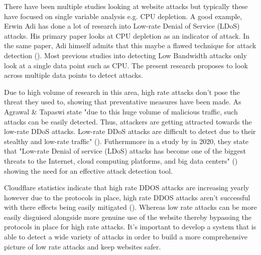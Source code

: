 
There have been multiple studies looking at website attacks but typically these have focused on single variable analysis e.g. CPU depletion. A good example, Erwin Adi has done a lot of research into Low-rate Denial of Service (LDoS) attacks. His primary paper looks at CPU depletion as an indicator of attack. In the same paper, Adi himself admits that this maybe a flawed technique for attack detection (\cite{Adi2016}). Most previous studies into detecting Low Bandwidth attacks only look at a single data point such as CPU. The present research proposes to look across multiple data points to detect attacks. 

Due to high volume of research in this area, high rate attacks don't pose the threat they used to, showing that preventative measures have been made. As Agrawal \& Tapaswi state "due to this huge volume of malicious traffic, such attacks can be easily detected. Thus, attackers are getting attracted towards the low-rate DDoS attacks. Low-rate DDoS attacks are difficult to detect due to their stealthy and low-rate traffic" (\cite{8794618}). Futhermmore in a study by \citeauthor{9016229} in 2020, they state that "Low-rate Denial of service (LDoS) attacks has become one of the biggest threats to the Internet, cloud computing platforms, and big data centers" (\cite{9016229}) showing the need for an effective attack detection tool.

Cloudflare statistics indicate that high rate DDOS attacks are increasing yearly however due to the protocols in place, high rate DDOS attacks aren't successful with there effects being easily mitigated (\cite{Q3attacks}). Whereas low rate attacks can be more easily disguised alongside more genuine use of the website thereby bypassing the protocols in place for high rate attacks. It's important to develop a system that is able to detect a wide variety of attacks in order to build a more comprehensive picture of low rate attacks and keep websites safer.

